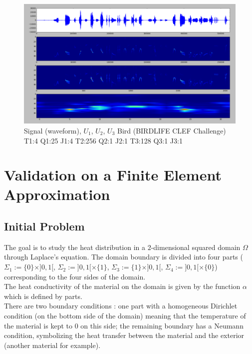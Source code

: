 \documentclass[a4paper]{report}
\begin{document}
\begin{figure}[H]
\begin{center}
\includegraphics[scale=0.21]{bird.png}\caption{Signal (waveform), $U_1$, $U_2$, $U_3$ Bird (BIRDLIFE CLEF Challenge) T1:4 Q1:25 J1:4 T2:256 Q2:1 J2:1 T3:128 Q3:1 J3:1}
\end{center}
\end{figure}
\part{Validation on a Finite Element Approximation}

\chapter{Initial Problem}
The goal is to study the heat distribution in a $2$-dimensional squared domain $\Omega$ through Laplace's equation. The domain boundary is divided into four parts ($\Sigma_1:=\{0\}\times]0,1[$, $\Sigma_2:=]0,1[ \times \{1\}$, $\Sigma_3:=\{1\} \times ]0,1[$, $ \Sigma_4:=]0,1[\times \{0\}$)  corresponding to the four sides of the domain.\\
The heat conductivity of the material on the domain is given by the function $\alpha$ which is defined by parts.\\
There are two boundary conditions : one part with a homogeneous Dirichlet condition (on the bottom side of the domain) meaning that the temperature of the material is kept to $0$ on this side; the remaining boundary has a  Neumann condition, symbolizing the heat transfer between the material and the exterior (another material for example).
\end{document}
